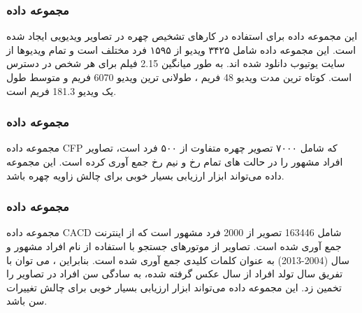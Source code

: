 \subsubsection{مجموعه داده }
این مجموعه داده برای استفاده در کارهای تشخیص چهره در تصاویر ویدیویی ایجاد شده است. این مجموعه داده شامل ۳۴۲۵ ویدیو از ۱۵۹۵ فرد مختلف است و تمام ویدیوها از سایت یوتیوب دانلود شده اند. به طور میانگین 2.15 فیلم برای هر شخص در دسترس است. کوتاه ترین مدت ویدیو 48 فریم ، طولانی ترین ویدیو 6070 فریم و متوسط طول یک ویدیو 181.3 فریم است. \cite{VGGFace2_dataset}

\subsubsection{مجموعه داده }
مجموعه داده CFP  که شامل ۷۰۰۰ تصویر چهره متفاوت از ۵۰۰ فرد است، تصاویر افراد مشهور را در حالت های تمام رخ و نیم رخ جمع آوری کرده است. این مجموعه داده می‌تواند ابزار ارزیابی بسیار خوبی برای چالش زاویه چهره باشد. \cite{LFW_dataset}

\subsubsection{مجموعه داده }
مجموعه داده CACD  شامل 163446 تصویر از 2000 فرد مشهور است که از اینترنت جمع آوری شده است. تصاویر از موتورهای جستجو با استفاده از نام افراد مشهور و سال (2004-2013) به عنوان کلمات کلیدی جمع آوری شده است. بنابراین ، می توان با تفریق سال تولد افراد از سال عکس گرفته شده، به سادگی سن افراد در تصاویر را تخمین زد.  این مجموعه داده می‌تواند ابزار ارزیابی بسیار خوبی برای چالش تغییرات سن باشد. \cite{CACD_dataset}

